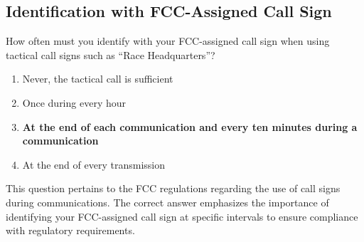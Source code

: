 \subsection{Identification with FCC-Assigned Call Sign}
\label{T1F02}

\begin{tcolorbox}[colback=gray!10!white,colframe=black!75!black,title=T1F02]
How often must you identify with your FCC-assigned call sign when using tactical call signs such as “Race Headquarters”?
\begin{enumerate}[label=\Alph*,noitemsep]
    \item Never, the tactical call is sufficient
    \item Once during every hour
    \item \textbf{At the end of each communication and every ten minutes during a communication}
    \item At the end of every transmission
\end{enumerate}
\end{tcolorbox}

This question pertains to the FCC regulations regarding the use of call signs during communications. The correct answer emphasizes the importance of identifying your FCC-assigned call sign at specific intervals to ensure compliance with regulatory requirements.